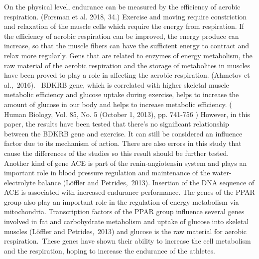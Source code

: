 \documentclass{article}
\begin{document}
On the physical level, endurance can be measured by the efficiency of aerobic respiration. (Forsman et al. 2018, 34.) Exercise and moving require constriction and relaxation of the muscle cells which require the energy from respiration. If the efficiency of aerobic respiration can be improved, the energy produce can increase, so that the muscle fibers can have the sufficient energy to contract and relax more regularly. Gens that are related to enzymes of energy metabolism, the raw material of the aerobic respiration and the storage of metabolites in muscles have been proved to play a role in affecting the aerobic respiration. (Ahmetov et al., 2016).  BDKRB gene, which is correlated with higher skeletal muscle metabolic efficiency and glucose uptake during exercise, helps to increase the amount of glucose in our body and helps to increase metabolic efficiency. ( Human Biology, Vol. 85, No. 5 (October 1, 2013), pp. 741-756 ) However, in this paper, the results have been tested that there’s no significant relationship between the BDKRB gene and exercise. It can still be considered an influence factor due to its mechanism of action. There are also errors in this study that cause the differences of the studies so this result should be further tested. Another kind of gene ACE is part of the renin-angiotensin system and plays an important role in blood pressure regulation and maintenance of the water-electrolyte balance (Löffler and Petrides, 2013). Insertion of the DNA sequence of ACE is associated with increased endurance performance. The genes of the PPAR group also play an important role in the regulation of energy metabolism via mitochondria. Transcription factors of the PPAR group influence several genes involved in fat and carbohydrate metabolism and uptake of glucose into skeletal muscles (Löffler and Petrides, 2013) and glucose is the raw material for aerobic respiration. These genes have shown their ability to increase the cell metabolism and the respiration, hoping to increase the endurance of the athletes.

\printbibliography{}
\end{document}
